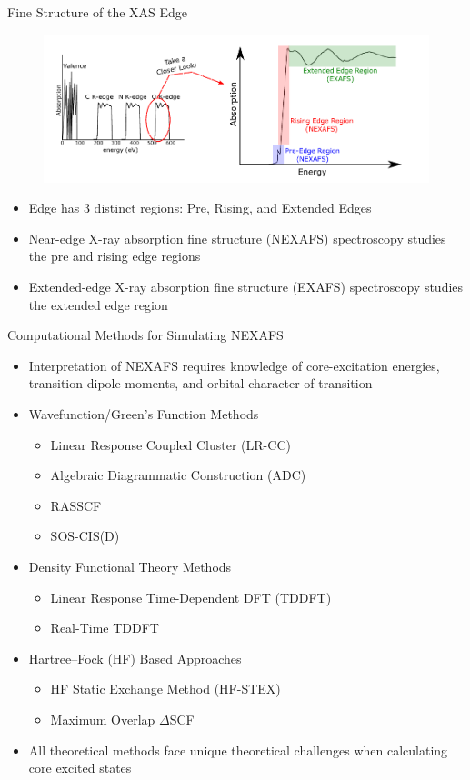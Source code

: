 \documentclass[t]{beamer}
\begin{document}
\begin{frame}{Fine Structure of the XAS Edge}
\begin{figure}
\includegraphics[scale=0.7]{fine_structure.pdf}
\end{figure}
\begin{itemize}
\item Edge has 3 distinct regions: Pre, Rising, and Extended Edges
\item Near-edge X-ray absorption fine structure (NEXAFS) spectroscopy studies the pre and rising edge regions
\item Extended-edge X-ray absorption fine structure (EXAFS) spectroscopy studies the extended edge region\footnotemark
\end{itemize}
\end{frame}

\begin{frame}{Computational Methods for Simulating NEXAFS}
\begin{itemize}
\item Interpretation of NEXAFS requires knowledge of core-excitation energies, transition dipole moments, and orbital character of transition
\item Wavefunction/Green's Function Methods
		\begin{itemize}
		\item Linear Response Coupled Cluster (LR-CC)
		\item Algebraic Diagrammatic Construction (ADC)
		\item RASSCF
		\item SOS-CIS(D)
		\end{itemize}
\item Density Functional Theory Methods
		\begin{itemize}
		\item Linear Response Time-Dependent DFT (TDDFT)
		\item Real-Time TDDFT
		\end{itemize}
\item Hartree--Fock (HF) Based Approaches
		\begin{itemize}
		\item HF Static Exchange Method (HF-STEX)
		\item Maximum Overlap $\Delta$SCF
		\end{itemize}
\item All theoretical methods face unique theoretical challenges when calculating core excited states
\end{itemize}
\end{frame}
\end{document}
